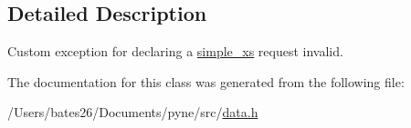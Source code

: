 \subsection{Detailed Description}
Custom exception for declaring a \hyperlink{structsimple__xs}{simple\+\_\+xs} request invalid. 

The documentation for this class was generated from the following file\+:\begin{DoxyCompactItemize}
\item 
/\+Users/bates26/\+Documents/pyne/src/\hyperlink{data_8h}{data.\+h}\end{DoxyCompactItemize}
